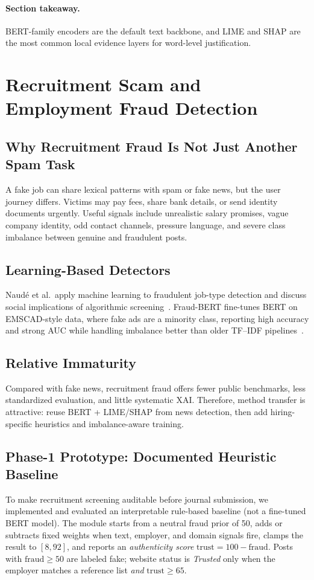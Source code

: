 \documentclass[runningheads]{llncs}
\begin{document}
\paragraph{Section takeaway.}
BERT-family encoders are the default text backbone, and LIME and SHAP are the most common local evidence layers for word-level justification.

\section{Recruitment Scam and Employment Fraud Detection}
\label{sec:recruit}

\subsection{Why Recruitment Fraud Is Not Just Another Spam Task}
A fake job can share lexical patterns with spam or fake news, but the user journey differs. Victims may pay fees, share bank details, or send identity documents urgently. Useful signals include unrealistic salary promises, vague company identity, odd contact channels, pressure language, and severe class imbalance between genuine and fraudulent posts.

\subsection{Learning-Based Detectors}
Naud\'{e} et al.\ apply machine learning to fraudulent job-type detection and discuss social implications of algorithmic screening~\cite{r37}. Fraud-BERT fine-tunes BERT on EMSCAD-style data, where fake ads are a minority class, reporting high accuracy and strong AUC while handling imbalance better than older TF--IDF pipelines~\cite{r38}.

\subsection{Relative Immaturity}
Compared with fake news, recruitment fraud offers fewer public benchmarks, less standardized evaluation, and little systematic XAI. Therefore, method transfer is attractive: reuse BERT + LIME/SHAP from news detection, then add hiring-specific heuristics and imbalance-aware training.

\subsection{Phase-1 Prototype: Documented Heuristic Baseline}
\label{sec:recruit_proto}
To make recruitment screening auditable before journal submission, we implemented and evaluated an interpretable rule-based baseline (not a fine-tuned BERT model). The module starts from a neutral fraud prior of 50, adds or subtracts fixed weights when text, employer, and domain signals fire, clamps the result to $[8,92]$, and reports an \emph{authenticity score} $\text{trust}=100-\text{fraud}$. Posts with $\text{fraud}\geq 50$ are labeled fake; website status is \emph{Trusted} only when the employer matches a reference list \emph{and} $\text{trust}\geq 65$.
\end{document}
